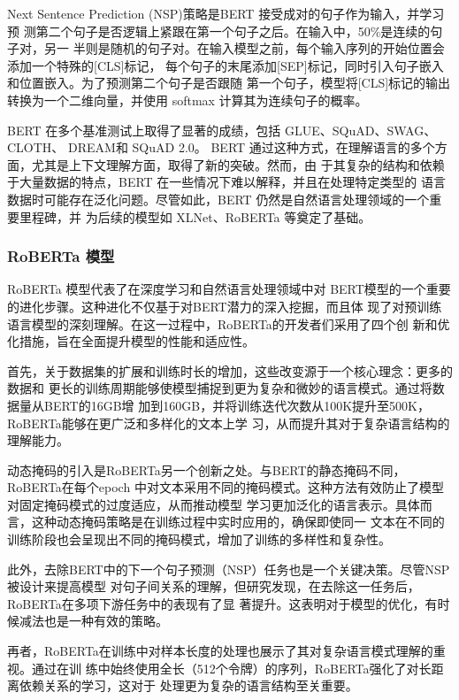 Next Sentence Prediction (NSP)策略是BERT 接受成对的句子作为输入，并学习预
测第二个句子是否逻辑上紧跟在第一个句子之后。在输入中，50\%是连续的句子对，另一
半则是随机的句子对。在输入模型之前，每个输入序列的开始位置会添加一个特殊的[CLS]标记，
每个句子的末尾添加[SEP]标记，同时引入句子嵌入和位置嵌入。为了预测第二个句子是否跟随
第一个句子，模型将[CLS]标记的输出转换为一个二维向量，并使用 softmax 计算其为连续句子的概率。

BERT 在多个基准测试上取得了显著的成绩，包括 
GLUE、SQuAD、SWAG\cite{zellers2018swag}、CLOTH\cite{xie2018large}、
DREAM\cite{sun2019dream}和 SQuAD 2.0。
BERT 通过这种方式，在理解语言的多个方面，尤其是上下文理解方面，取得了新的突破。然而，由
于其复杂的结构和依赖于大量数据的特点，BERT 在一些情况下难以解释，并且在处理特定类型的
语言数据时可能存在泛化问题。尽管如此，BERT 仍然是自然语言处理领域的一个重要里程碑，并
为后续的模型如 XLNet、RoBERTa 等奠定了基础。

\subsubsection*{RoBERTa 模型}
RoBERTa 模型代表了在深度学习和自然语言处理领域中对
BERT模型的一个重要的进化步骤。这种进化不仅基于对BERT潜力的深入挖掘，而且体
现了对预训练语言模型的深刻理解。在这一过程中，RoBERTa的开发者们采用了四个创
新和优化措施，旨在全面提升模型的性能和适应性。

首先，关于数据集的扩展和训练时长的增加，这些改变源于一个核心理念：更多的数据和
更长的训练周期能够使模型捕捉到更为复杂和微妙的语言模式。通过将数据量从BERT的16GB增
加到160GB，并将训练迭代次数从100K提升至500K，RoBERTa能够在更广泛和多样化的文本上学
习，从而提升其对于复杂语言结构的理解能力。

动态掩码的引入是RoBERTa另一个创新之处。与BERT的静态掩码不同，RoBERTa在每个epoch
中对文本采用不同的掩码模式。这种方法有效防止了模型对固定掩码模式的过度适应，从而推动模型
学习更加泛化的语言表示。具体而言，这种动态掩码策略是在训练过程中实时应用的，确保即使同一
文本在不同的训练阶段也会呈现出不同的掩码模式，增加了训练的多样性和复杂性。

此外，去除BERT中的下一个句子预测（NSP）任务也是一个关键决策。尽管NSP被设计来提高模型
对句子间关系的理解，但研究发现，在去除这一任务后，RoBERTa在多项下游任务中的表现有了显
著提升。这表明对于模型的优化，有时候减法也是一种有效的策略。

再者，RoBERTa在训练中对样本长度的处理也展示了其对复杂语言模式理解的重视。通过在训
练中始终使用全长（512个令牌）的序列，RoBERTa强化了对长距离依赖关系的学习，这对于
处理更为复杂的语言结构至关重要。

